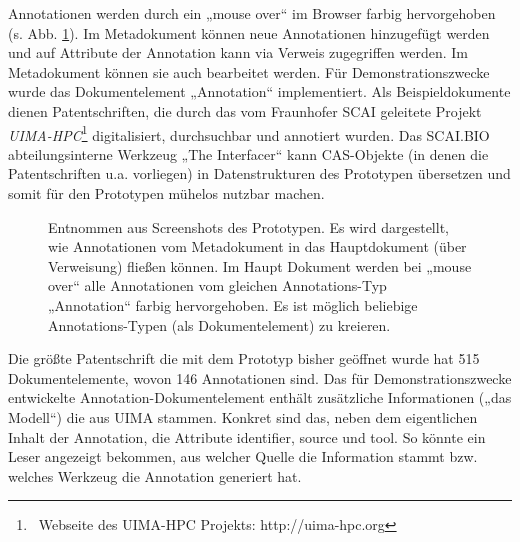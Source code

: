  
Annotationen werden durch ein „mouse over“ im Browser farbig hervorgehoben (s. Abb. \ref{annotation}). Im Metadokument können neue Annotationen hinzugefügt werden und auf Attribute der Annotation kann via Verweis zugegriffen werden. Im Metadokument können sie auch bearbeitet werden. Für Demonstrationszwecke wurde das Dokumentelement „Annotation“ implementiert. Als Beispieldokumente dienen Patentschriften, die durch das vom Fraunhofer SCAI geleitete Projekt \emph{UIMA-HPC}\footnote{~Webseite des UIMA-HPC Projekts: http://uima-hpc.org} digitalisiert, durchsuchbar und annotiert wurden. Das SCAI.BIO abteilungsinterne Werkzeug „The Interfacer“ kann CAS-Objekte (in denen die Patentschriften u.a. vorliegen) in Datenstrukturen des Prototypen übersetzen und somit für den Prototypen mühelos nutzbar machen.

 
\begin{figure}[h!]
\centering
{}
\caption[Hauptdokument und Metadokument]{ Entnommen aus Screenshots des Prototypen. Es wird dargestellt, wie Annotationen vom Metadokument in das Hauptdokument (über Verweisung) fließen können. Im Haupt Dokument werden bei „mouse over“ alle Annotationen vom gleichen Annotations-Typ „Annotation“ farbig hervorgehoben. Es ist möglich beliebige Annotations-Typen (als Dokumentelement) zu kreieren. }\label{annotation}
\end{figure}
 
Die größte Patentschrift die mit dem Prototyp bisher geöffnet wurde hat 515 Dokumentelemente, wovon 146 Annotationen sind. Das für Demonstrationszwecke entwickelte Annotation-Dokumentelement enthält zusätzliche Informationen („das Modell“) die aus UIMA stammen. Konkret sind das, neben dem eigentlichen Inhalt der Annotation, die Attribute identifier, source und tool. So könnte ein Leser angezeigt bekommen, aus welcher Quelle die Information stammt bzw. welches Werkzeug die Annotation generiert hat.

